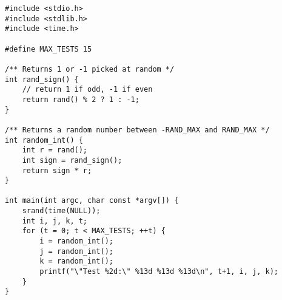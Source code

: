 \documentclass{article}
\newenvironment{captionedlisting}{}{}
\begin{document}
\begin{captionedlisting}
  \label{lst:rand-test-gen}
  \begin{lstlisting}
#include <stdio.h>
#include <stdlib.h>
#include <time.h>

#define MAX_TESTS 15

/** Returns 1 or -1 picked at random */
int rand_sign() {
    // return 1 if odd, -1 if even
    return rand() % 2 ? 1 : -1;
}

/** Returns a random number between -RAND_MAX and RAND_MAX */
int random_int() {
    int r = rand();
    int sign = rand_sign();
    return sign * r;
}

int main(int argc, char const *argv[]) {
    srand(time(NULL));
    int i, j, k, t;
    for (t = 0; t < MAX_TESTS; ++t) {
        i = random_int();
        j = random_int();
        k = random_int();
        printf("\"Test %2d:\" %13d %13d %13d\n", t+1, i, j, k);
    }
}
  \end{lstlisting}
\end{captionedlisting}
\end{document}
